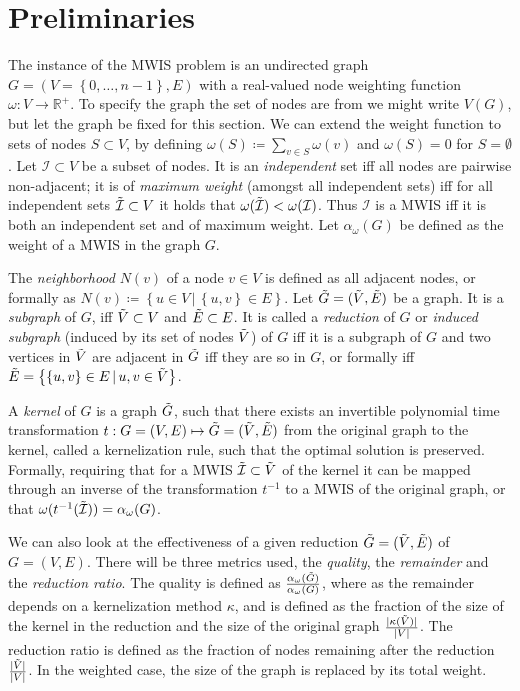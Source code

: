 \documentclass[acmsmall,nonacm,screen,review]{acmart}
\newcommand{\set}[1]{\left\{ #1\right\}}
\newcommand{\ra}{\rightarrow}
\newcommand{\R}{\mathbb{R}}
\begin{document}
\section{Preliminaries}
The instance of the MWIS problem is an undirected graph $G=(V=\set{0, \dots, n-1}, E)$ with a real-valued node weighting function $\omega : V \ra \R^+$. To specify the graph the set of nodes are from we might write $V(G)$, but let the graph be fixed for this section. 
We can extend the weight function to sets of nodes $S\subset V$, by defining $\omega(S) \coloneqq \sum_{v\in S} \omega(v)$ and $\omega(S)=0$ for $S=\emptyset$.
Let $\mathcal{I}\subset V$ be a subset of nodes. It is an \emph{independent} set iff all nodes are pairwise non-adjacent; it is of \emph{maximum weight} (amongst all independent sets) iff for all independent sets $\Tilde{\mathcal{I}} \subset V$ it holds that $\omega(\Tilde{\mathcal{I}}) < \omega(\mathcal{I})$.
Thus $\mathcal{I}$ is a MWIS iff it is both an independent set and of maximum weight.
Let $\alpha_\omega(G)$ be defined as the weight of a MWIS in the graph $G$.

The \emph{neighborhood} $N(v)$ of a node $v\in V$ is defined as all adjacent nodes, or formally as $N(v) \coloneqq \set{u\in V \, | \, \set{u, v}\in E}$.
Let $\Tilde{G}=(\Tilde{V}, \Tilde{E})$ be a graph.
It is a \emph{subgraph} of $G$, iff $\Tilde{V} \subset V$ and $\Tilde{E} \subset E$. It is called a \emph{reduction} of $G$ or  \emph{induced subgraph} (induced by its set of nodes $\Tilde{V}$) of $G$ iff it is a subgraph of $G$ and two vertices in $\Tilde{V}$ are adjacent in $\Tilde{G}$ iff they are so in $G$, or formally iff $\Tilde{E}=\set{\set{u,v}\in E \, | \, u,v \in \Tilde{V}}$.

A \emph{kernel} of $G$ is a graph $\Tilde{G}$, such that there exists an invertible polynomial time transformation $t : G=(V, E) \mapsto \Tilde{G}=(\Tilde{V}, \Tilde{E})$ from the original graph to the kernel, called a kernelization rule, such that the optimal solution is preserved. 
Formally, requiring that for a MWIS $\Tilde{\mathcal{I}} \subset \Tilde{V}$ of the kernel it can be mapped through an inverse of the transformation $t^{-1}$ to a MWIS of the original graph, or that $\omega(t^{-1}(\Tilde{\mathcal{I}}))=\alpha_\omega(G)$.

We can also look at the effectiveness of a given reduction $\Tilde{G}=(\Tilde{V}, \Tilde{E})$ of $G=(V,E)$.
There will be three metrics used, the \emph{quality}, the \emph{remainder} and the \emph{reduction ratio}.
The quality is defined as  $\frac{\alpha_\omega(\Tilde{G})}{\alpha_\omega(G)}$,
where as the remainder depends on a kernelization method $\kappa$,
and is defined as the fraction of the size of the kernel in the reduction and the size of the original graph $\frac{|\kappa(\Tilde{V})|}{|V|}$.
The reduction ratio is defined as the fraction of nodes remaining after the reduction $\frac{|\Tilde{V}|}{|V|}$. In the weighted case, the size of the graph is replaced by its total weight.
\end{document}
